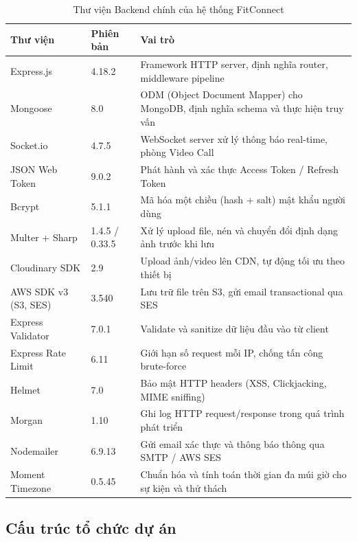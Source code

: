 \begin{table}[H]
\centering
\caption{Thư viện Backend chính của hệ thống FitConnect}
\label{tab:impl_be_libs}
\begin{tabular}{|p{4.5cm}|p{2cm}|p{7.5cm}|}
\hline
\textbf{Thư viện} & \textbf{Phiên bản} & \textbf{Vai trò} \\
\hline
Express.js & 4.18.2 & Framework HTTP server, định nghĩa router, middleware pipeline \\
\hline
Mongoose & 8.0 & ODM (Object Document Mapper) cho MongoDB, định nghĩa schema và thực hiện truy vấn \\
\hline
Socket.io & 4.7.5 & WebSocket server xử lý thông báo real-time, phòng Video Call \\
\hline
JSON Web Token & 9.0.2 & Phát hành và xác thực Access Token / Refresh Token \\
\hline
Bcrypt & 5.1.1 & Mã hóa một chiều (hash + salt) mật khẩu người dùng \\
\hline
Multer + Sharp & 1.4.5 / 0.33.5 & Xử lý upload file, nén và chuyển đổi định dạng ảnh trước khi lưu \\
\hline
Cloudinary SDK & 2.9 & Upload ảnh/video lên CDN, tự động tối ưu theo thiết bị \\
\hline
AWS SDK v3 (S3, SES) & 3.540 & Lưu trữ file trên S3, gửi email transactional qua SES \\
\hline
Express Validator & 7.0.1 & Validate và sanitize dữ liệu đầu vào từ client \\
\hline
Express Rate Limit & 6.11 & Giới hạn số request mỗi IP, chống tấn công brute-force \\
\hline
Helmet & 7.0 & Bảo mật HTTP headers (XSS, Clickjacking, MIME sniffing) \\
\hline
Morgan & 1.10 & Ghi log HTTP request/response trong quá trình phát triển \\
\hline
Nodemailer & 6.9.13 & Gửi email xác thực và thông báo thông qua SMTP / AWS SES \\
\hline
Moment Timezone & 0.5.45 & Chuẩn hóa và tính toán thời gian đa múi giờ cho sự kiện và thử thách \\
\hline
\end{tabular}
\end{table}

\subsection{Cấu trúc tổ chức dự án}
\label{subsec:impl_project_structure}

